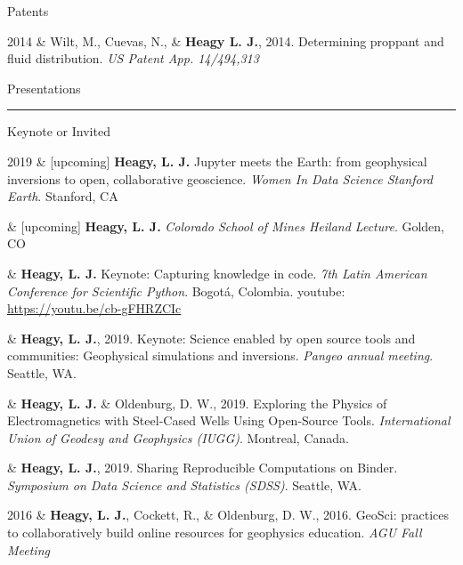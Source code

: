 \documentclass[a4paper, 11pt]{article}
\newcommand{\youtube}[1]{youtube: \href{https://youtu.be/XY3Tq9Wd1\_A}{#1}}
\newcommand{\heading}[1]{
    \begin{minipage}[t]{\textwidth}
    \vspace{0.12cm}
    {\LARGE #1}\\
    \vspace{-0.24cm}
    \hrule
    \end{minipage}
    \vspace{0.05cm}

}
\newcommand{\subheading}[1]{
    \vspace{0.5cm}
    {\Large #1}\\
    \vspace{-0.2cm}
}
\begin{document}
\subheading{Patents}

\begin{entryright}
2014 & Wilt, M., Cuevas, N., \& \textbf{Heagy L. J.}, 2014. Determining proppant and fluid distribution. \emph{US Patent App. 14/494,313}
\end{entryright}



\heading{Presentations}

\subheading{Keynote or Invited}


\begin{entryright}
2019 & [upcoming] \textbf{Heagy, L. J.} Jupyter meets the Earth: from geophysical inversions to open, collaborative geoscience. \emph{Women In Data Science \@ Stanford Earth}. Stanford, CA
\end{entryright}

\begin{entryright}
& [upcoming] \textbf{Heagy, L. J.} \emph{Colorado School of Mines Heiland Lecture}. Golden, CO
\end{entryright}

\begin{entryright}
& \textbf{Heagy, L. J.} Keynote: Capturing knowledge in code. \emph{7th Latin American Conference for Scientific Python}. Bogot\'a, Colombia. \youtube{https://youtu.be/cb-gFHRZCIc}
\end{entryright}

\begin{entryright}
& \textbf{Heagy, L. J.}, 2019. Keynote: Science enabled by open source tools and communities: Geophysical simulations and inversions. \emph{Pangeo annual meeting}. Seattle, WA.
\end{entryright}

\begin{entryright}
& \textbf{Heagy, L. J.} \& Oldenburg, D. W., 2019. Exploring the Physics of Electromagnetics with Steel-Cased Wells Using Open-Source Tools. \emph{International Union of Geodesy and Geophysics (IUGG)}. Montreal, Canada.
\end{entryright}

\begin{entryright}
&  \textbf{Heagy, L. J.}, 2019. Sharing Reproducible Computations on Binder. \emph{Symposium on Data Science and Statistics (SDSS)}. Seattle, WA.
\end{entryright}


\begin{entryright}
2016 & \textbf{Heagy, L. J.}, Cockett, R., \& Oldenburg, D. W., 2016. GeoSci: practices to collaboratively build online resources for geophysics education. \emph{AGU Fall Meeting}
\end{entryright}
\end{document}
